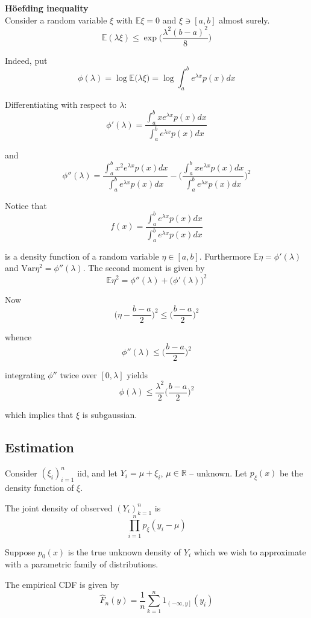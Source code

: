 \documentclass[a4paper]{article}
\newcommand{\clo}[1]{{\left [ #1 \right ]}}
\newcommand{\ploc}[1]{{\left ( #1 \right ]}}
\newcommand{\brac}[1]{{\left ( #1 \right )}}
\newcommand{\Real}{\mathbb{R}}
\newcommand{\ex}{\mathbb{E}}
\newcommand{\Var}{\text{Var}}
\begin{document}
\noindent\textbf{H\"oefding inequality}\hfill\\
Consider a random variable $\xi$ with $\ex \xi = 0$ and $\xi\ni\clo{a,b}$ almost surely.
\[\ex\brac{\lambda \xi}\leq \exp\big( \frac{\lambda^2(b-a)^2}{8} \big)\]

Indeed, put
\[\phi(\lambda) = \log \ex\big(\lambda \xi\big) = \log \int_a^b e^{\lambda x} p(x) dx\]

Differentiating with respect to $\lambda$:
\[\phi'(\lambda) = \frac{\int_a^b x e^{\lambda x} p(x) dx}{\int_a^b e^{\lambda x} p(x) dx}\]

and 
\[\phi''(\lambda) = \frac{\int_a^b x^2 e^{\lambda x} p(x) dx}{\int_a^b e^{\lambda x} p(x) dx} - \bigg( \frac{\int_a^b x e^{\lambda x} p(x) dx}{\int_a^b e^{\lambda x} p(x) dx} \bigg)^2\]

Notice that
\[f(x) = \frac{\int_a^b e^{\lambda x} p(x) dx}{\int_a^b e^{\lambda x} p(x) dx}\]

is a density function of a random variable $\eta\in \clo{a,b}$. Furthermore $\ex \eta = \phi'(\lambda)$ and $\Var \eta^2 = \phi''(\lambda)$. The second moment is given by
\[\ex \eta^2 = \phi''(\lambda) + \big(\phi'(\lambda)\big)^2\]

Now
\[\bigg(\eta - \frac{b-a}{2}\bigg)^2 \leq \bigg(\frac{b-a}{2}\bigg)^2\]

whence 
\[\phi''(\lambda) \leq \bigg(\frac{b-a}{2}\bigg)^2 \]

integrating $\phi''$ twice over $\clo{0,\lambda}$ yields
\[\phi(\lambda) \leq \frac{\lambda^2}{2}\bigg(\frac{b-a}{2}\bigg)^2\]

which implies that $\xi$ is subgaussian.


\subsection{Estimation} %
\label{sub:estimation}

Consider $\brac{\xi_i}_{i=1}^n$ iid, and let $Y_i = \mu + \xi_i$, $\mu\in \Real$ -- unknown. Let $p_\xi(x)$ be the density function of $\xi$.

The joint density of observed $\brac{Y_i}_{k=1}^n$ is 
\[\prod_{i=1}^n p_\xi(y_i - \mu)\]

Suppose $p_0(x)$ is the true unknown density of $Y_i$ which we wish to approximate with a parametric family of distributions.

The empirical CDF is given by
\[\hat{F}_n(y) = \frac{1}{n}\sum_{k=1}^n 1_{\ploc{-\infty, y}}(y_i)\]
\end{document}
